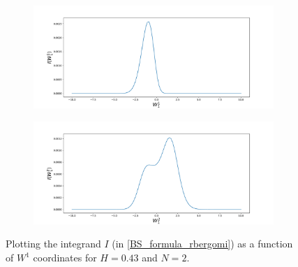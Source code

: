 \documentclass[11pt]{article}
\begin{document}
\begin{figure}[h!]
	\centering
	\begin{subfigure}{.5\textwidth}
		\centering
		\includegraphics[width=1\linewidth]{./figures/integrand_plotting_rBergomi/1D_plots/N_2/H_043/Bergomi_integrand_K_1_H_043_W11_N_2}
		\caption{}
		\label{fig:sub3}
	\end{subfigure}%
	\begin{subfigure}{.5\textwidth}
		\centering
		\includegraphics[width=1\linewidth]{./figures/integrand_plotting_rBergomi/1D_plots/N_2/H_043/Bergomi_integrand_K_1_H_043_W12_N_2}
		\caption{}
		\label{fig:sub4}
	\end{subfigure}
	\caption{Plotting the integrand $I$ (in \eqref{BS_formula_rbergomi}) as a function of $W^1$ coordinates for $H=0.43$ and $N=2$.}
	\label{fig:Integrand_H_043_N_2_W_1}
\end{figure}
\end{document}
